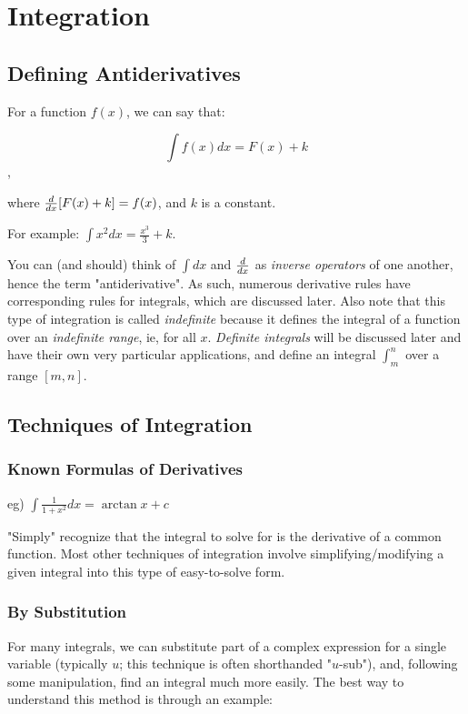 \documentclass[12pt]{article}
\begin{document}
\section{Integration}
\subsection{Defining Antiderivatives}

For a function $f(x)$, we can say that:

$$\int f(x) dx = F(x) + k$$,

where $\frac{d}{dx} [F(x)+k] = f(x)$, and $k$ is a constant.

For example: $\int x^2 dx = \frac{x^3}{3} + k$.

You can (and should) think of $\int  dx$ and $\frac{d}{dx}$ as \textit{inverse operators} of one another, hence the term "antiderivative". As such, numerous derivative rules have corresponding rules for integrals, which are discussed later. Also note that this type of integration is called \textit{indefinite} because it defines the integral of a function over an \textit{indefinite range}, ie, for all $x$. \textit{Definite integrals} will be discussed later and have their own very particular applications, and define an integral $\int_m^n$ over a range $[m,n]$.

\subsection{Techniques of Integration}
\subsubsection{Known Formulas of Derivatives}

eg) $\int \frac{1}{1+x^2} dx = \arctan x + c$

"Simply" recognize that the integral to solve for is the derivative of a common function. Most other techniques of integration involve simplifying/modifying a given integral into this type of easy-to-solve form.

\subsubsection{By Substitution}

For many integrals, we can substitute part of a complex expression for a single variable (typically $u$; this technique is often shorthanded "$u$-sub"), and, following some manipulation, find an integral much more easily. The best way to understand this method is through an example:
\end{document}
